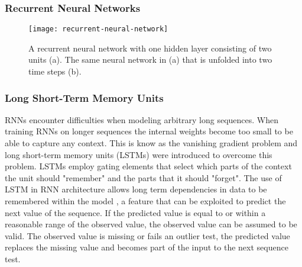 \subsubsection{Recurrent Neural Networks}
\begin{figure}
\centering	
\texttt{[image: recurrent-neural-network]}
\caption{A recurrent neural network with one hidden layer consisting of two units (a). The same neural network in (a) that is unfolded into two time steps (b).}
\label{fig:recurrent-neural-network}
\end{figure}

\subsubsection{Long Short-Term Memory Units}
RNNs encounter difficulties when modeling arbitrary long sequences. When training RNNs on longer sequences the internal weights become too small to be able to capture any context. This is know as the vanishing gradient problem and long short-term memory units (LSTMs) were introduced to overcome this problem\cite{DBLP:journals/corr/Lipton15}. LSTMs employ gating elements that select which parts of the context the unit should "remember" and the parts that it should "forget"\cite{LSTM}.
The use of LSTM in RNN architecture allows long term dependencies in data to be remembered within the model \citep{Graves2013a}, a feature that can be exploited to predict the next value of the sequence. If the predicted value is equal to or within a reasonable range of the observed value, the observed value can be assumed to be valid. The observed value is missing or fails an outlier test, the predicted value replaces the missing value and becomes part of the input to the next sequence test.
